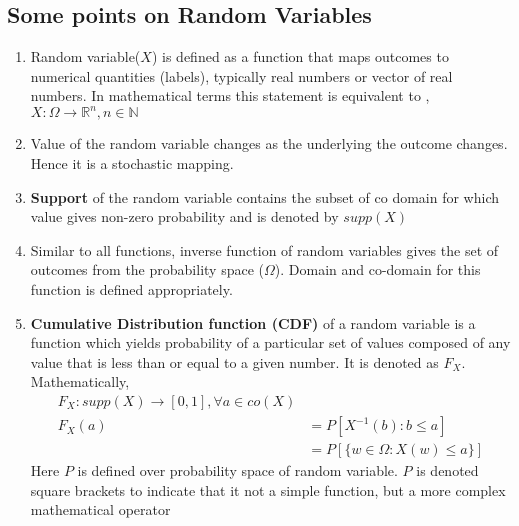 \documentclass[12pt]{report} %
\begin{document}
	\newpage
	\begin{center}
		\section*{Some points on Random Variables}
	\end{center}
	\begin{enumerate}
		\item Random variable($X$) is defined as a function  that maps outcomes to numerical quantities (labels), typically real numbers or vector of real numbers. In mathematical terms this statement is equivalent to , $X:\Omega \rightarrow \mathbb{R}^{n}, n \in \mathbb{N}$
		\item Value of the random variable changes as the underlying the outcome changes. Hence it is a stochastic mapping.
		\item \textbf{Support} of the random variable contains the subset of co domain for which value gives non-zero probability and is denoted by $\textit{supp}(X)$ 
		\item Similar to all functions, inverse function of random variables gives the set of outcomes from the probability space ($\Omega$). Domain and co-domain for this function is defined appropriately.  
		\item \textbf{Cumulative Distribution function (CDF)} of a random variable is a function which yields probability of a particular set of values composed of any value that is less than or equal to a given number. It is denoted as $F_X$. Mathematically, 
		\begin{equation} 
		\begin{aligned}
			F_X : supp(X) \rightarrow [0,1],  \forall a\in co(X)\\
			 F_X(a) &= P[X^{-1}(b): b \leq a] \\
			&= P[\{w\in \Omega:X(w) \leq a\}]
		\end{aligned}
		\end{equation}
		Here $P$ is defined over probability space of random variable. $P$ is denoted square brackets to indicate that it not a simple function, but a more complex mathematical operator 
	\end{enumerate}
\end{document}
